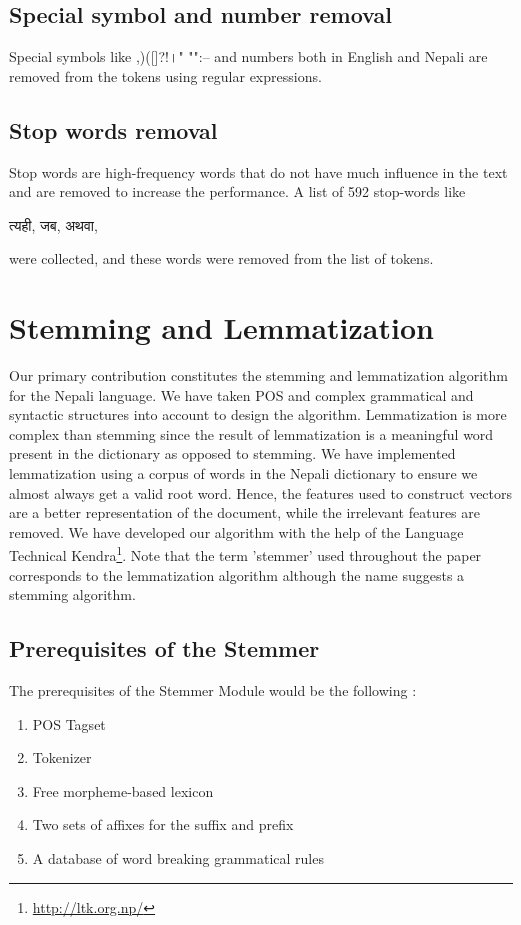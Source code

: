 \documentclass[conference]{IEEEtran}
\begin{document}
\subsection {Special symbol and number removal}
Special symbols like ,)({}[]?!।"  "":-- and numbers both in English and Nepali are removed from the tokens using regular expressions.
\medskip

\subsection {Stop words removal}
Stop words are high-frequency words that do not have much influence in the text and are removed to increase the performance.
A list of 592  stop-words like \begin{sanskrit}त्यही, जब, अथवा,\end{sanskrit} were collected, and these words were removed from the list of tokens. 
\medskip

\section {Stemming and Lemmatization}

Our primary contribution constitutes the stemming and lemmatization algorithm for
the Nepali language. We have taken POS and complex grammatical and syntactic
structures into account to design the algorithm. Lemmatization is more complex
than stemming since the result of lemmatization is a meaningful word present in
the dictionary as opposed to stemming. We have implemented lemmatization using a
corpus of words in the Nepali dictionary to ensure we almost always get a valid
root word. Hence, the features used to construct vectors are a better representation
of the document, while the irrelevant features are removed. 
We have developed our algorithm with the help of the 
Language Technical Kendra\footnote{\url{http://ltk.org.np/}}. Note that the term
'stemmer' used throughout the paper corresponds to the lemmatization algorithm
although the name suggests a stemming algorithm.

\subsection {Prerequisites of the Stemmer}

The prerequisites of the Stemmer Module would be the
following \cite{r10}:

\begin{enumerate}
  \item POS Tagset
  \item Tokenizer
  \item Free morpheme-based lexicon
  \item Two sets of affixes for the suffix and prefix
  \item A database of word breaking grammatical rules
\end{enumerate}
\end{document}
